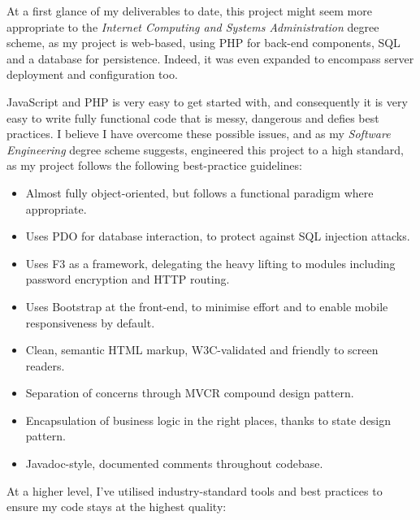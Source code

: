 At a first glance of my deliverables to date, this project might seem more appropriate to the \emph{Internet Computing and Systems Administration} degree scheme, as my project is web-based, using PHP for back-end components, SQL and a database for persistence. Indeed, it was even expanded to encompass server deployment and configuration too.

JavaScript and PHP is very easy to get started with, and consequently it is very easy to write fully functional code that is messy, dangerous and defies best practices. I believe I have overcome these possible issues, and as my \emph{Software Engineering} degree scheme suggests, engineered this project to a high standard, as my project follows the following best-practice guidelines:

\begin{itemize}
\item Almost fully object-oriented, but follows a functional paradigm where appropriate.
\item Uses PDO for database interaction, to protect against SQL injection attacks.
\item Uses F3 as a framework, delegating the heavy lifting to modules including password encryption and HTTP routing.
\item Uses Bootstrap at the front-end, to minimise effort and to enable mobile responsiveness by default.
\item Clean, semantic HTML markup, W3C-validated and friendly to screen readers.
\item Separation of concerns through MVCR compound design pattern.
\item Encapsulation of business logic in the right places, thanks to state design pattern.
\item Javadoc-style, documented comments throughout codebase.
\end{itemize}

At a higher level, I've utilised industry-standard tools and best practices to ensure my code stays at the highest quality:

